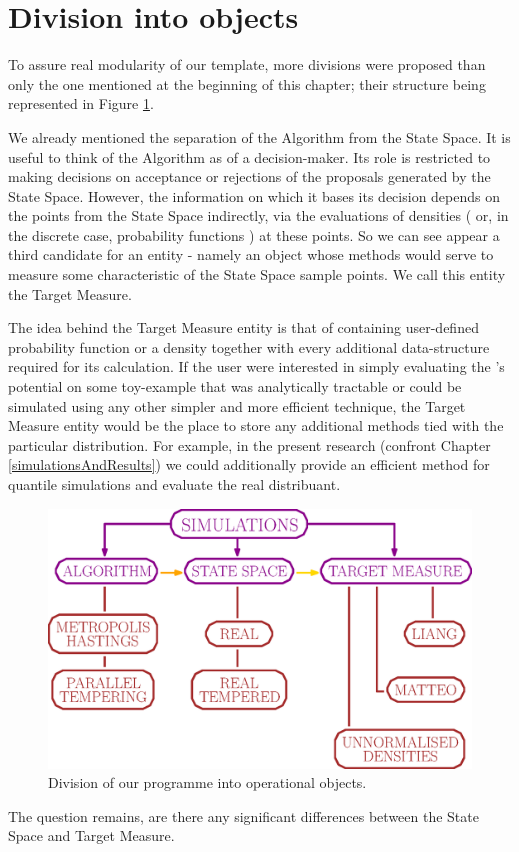 \section{Division into objects}

To assure real modularity of our template, more divisions were proposed than only the one mentioned at the beginning of this chapter; their structure being represented in Figure \ref{objectStructure}.

We already mentioned the separation of the Algorithm from the State Space. It is useful to think of the Algorithm as of a decision-maker. Its role is restricted to making decisions on acceptance or rejections of the proposals generated by the State Space. However, the information on which it bases its decision depends on the points from the State Space indirectly, via the evaluations of densities ( or, in the discrete case, probability functions ) at these points. So we can see appear a third candidate for an entity - namely an object whose methods would serve to measure some characteristic of the State Space sample points. We call this entity the Target Measure. 

The idea behind the Target Measure entity is that of containing user-defined probability function or a density together with every additional data-structure required for its calculation. If the user were interested in simply evaluating the \PT's potential on some toy-example that was analytically tractable or could be simulated using any other simpler and more efficient technique, the Target Measure entity would be the place to store any additional methods tied with the particular distribution. For example, in the present research (confront Chapter \ref{simulationsAndResults}) we could  additionally provide an efficient method for quantile simulations and evaluate the real distribuant. 

\begin{figure}
	\centering \includegraphics[keepaspectratio=true, width =\linewidth]{./img/objectStructure.eps}
	\caption{Division of our programme into operational objects.}\label{objectStructure}
\end{figure}

The question remains, are there any significant differences between the State Space and Target Measure.